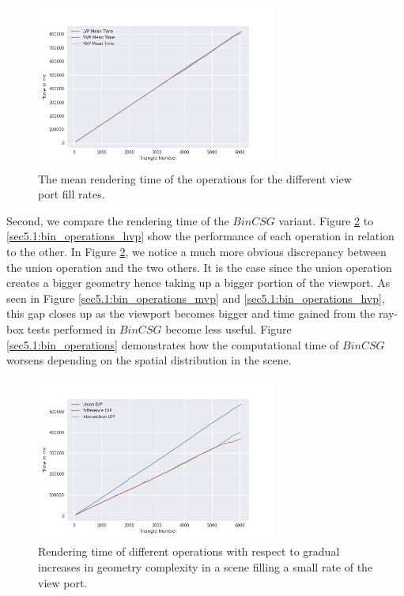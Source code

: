 \documentclass[a4paper,11pt,oneside]{article}
\begin{document}
\begin{figure}[H]
	\centering
	\includegraphics[width=0.7\textwidth]{section5/plots/naive_csg_mean.png}
	\caption{The mean rendering time of the operations for the different view port fill rates.}
	\label{sec5.1:naive_operations}
\end{figure}

Second, we compare the rendering time of the $BinCSG$ variant. Figure \ref{sec5.1:bin_operations_lvp} to \ref{sec5.1:bin_operations_hvp} show the performance of each operation in relation to the other. In Figure \ref{sec5.1:bin_operations_lvp}, we notice a much more obvious discrepancy between the union operation and the two others. It is the case since the union operation creates a bigger geometry hence taking up a bigger portion of the viewport. As seen in Figure \ref{sec5.1:bin_operations_mvp} and \ref{sec5.1:bin_operations_hvp}, this gap closes up as the viewport becomes bigger and time gained from the ray-box tests performed in $BinCSG$ become less useful. Figure \ref{sec5.1:bin_operations} demonstrates how the computational time of $BinCSG$ worsens depending on the spatial distribution in the scene.


\begin{figure}[H]
	\centering
	\includegraphics[width=0.7\textwidth]{section5/plots/bin_csg_lvp.png}
	\caption{Rendering time of different operations with respect to gradual increases in geometry complexity in a scene filling a small rate of the view port.}
	\label{sec5.1:bin_operations_lvp}
\end{figure}
\end{document}
